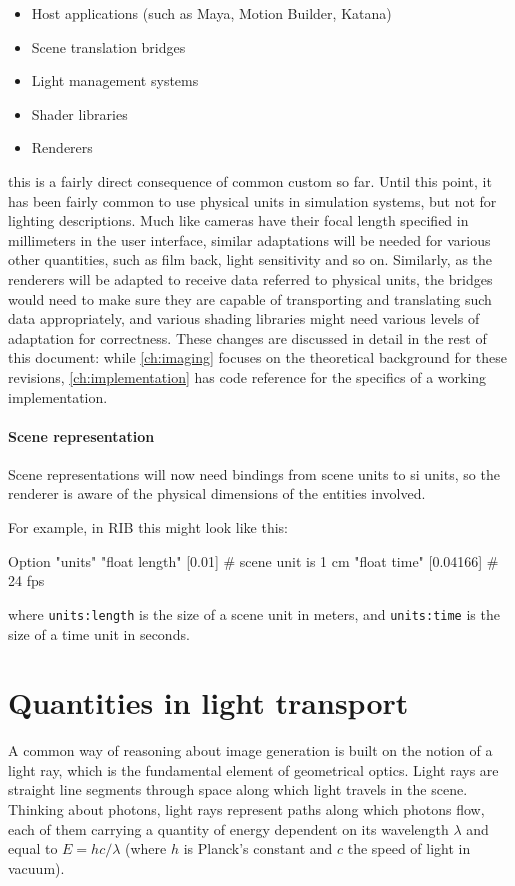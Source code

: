 \begin{itemize}
\item Host applications (such as Maya, Motion Builder, Katana)
\item Scene translation bridges
\item Light management systems
\item Shader libraries
\item Renderers
\end{itemize}
this is a fairly direct consequence of common custom so far. Until this point, it has been
fairly common to use physical units in simulation systems, but not for lighting descriptions.
Much like cameras have their focal length specified in millimeters in the user interface,
similar adaptations will be needed for various other quantities, such as film back, light 
sensitivity and so on. Similarly, as the renderers will be adapted to receive data
referred to physical units, the bridges would need to make sure they are capable of transporting
and translating such data appropriately, and various shading libraries might need various levels
of adaptation for correctness. These changes are discussed in detail in the rest of this document:
while \cref{ch:imaging} focuses on the theoretical background for these revisions,
\cref{ch:implementation} has code reference for the specifics of a working implementation.

\paragraph{Scene representation}

Scene representations will now need bindings from scene units to \gls{si} units,
so the renderer is aware of the physical dimensions of the entities involved.

For example, in \gls{RIB} this might look like this:

\begin{ribcode}
Option "units" "float length" [0.01]    # scene unit is 1 cm
               "float time"   [0.04166] # 24 fps
\end{ribcode}
where \Verb/units:length/ is the size of a scene unit in meters,
and \Verb/units:time/ is the size of a time unit in seconds.

\section{Quantities in light transport}

A common way of reasoning about image generation is built on the notion of a
light ray, which is the fundamental element of geometrical optics. Light rays
are straight line segments through space along which light travels in the scene.
Thinking about photons, light rays represent paths along which photons flow,
each of them carrying a quantity of energy dependent on its wavelength $\lambda$
and equal to $E = hc/\lambda$ (where $h$ is Planck's constant and $c$ the speed
of light in vacuum).

